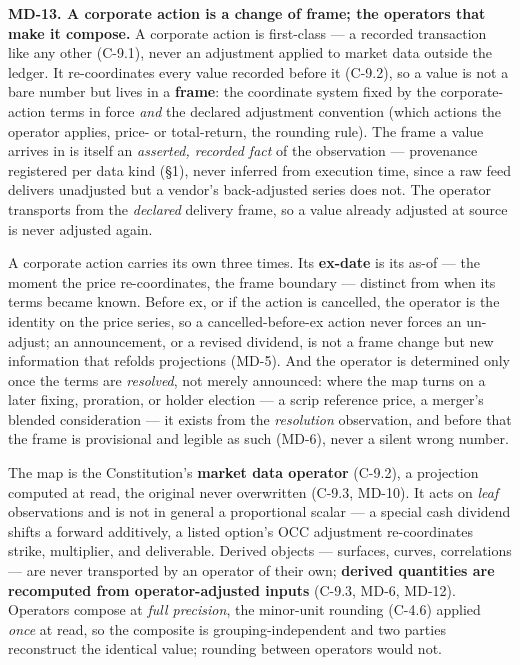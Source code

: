 \documentclass[11pt,a4paper]{article}
\newcommand{\mlabel}[1]{\leavevmode\hypertarget{md-#1}{}%
  \marginpar{\raggedright\scriptsize\ttfamily\textcolor{gray}{#1}}}
\begin{document}
\mlabel{MD-13}\textbf{MD-13. A corporate action is a change of frame; the
operators that make it compose.} A corporate action is first-class --- a
recorded transaction like any other (C-9.1), never an adjustment applied
to market data outside the ledger. It re-coordinates every value recorded
before it (C-9.2), so a value is not a bare number but lives in a
\textbf{frame}: the coordinate system fixed by the corporate-action terms
in force \emph{and} the declared adjustment convention (which actions the
operator applies, price- or total-return, the rounding rule). The frame a
value arrives in is itself an \emph{asserted, recorded
fact} of the observation --- provenance registered per data kind (\S1),
never inferred from execution time, since a raw feed delivers unadjusted
but a vendor's back-adjusted series does not. The operator transports from
the \emph{declared} delivery frame, so a value already adjusted at source
is never adjusted again.

A corporate action carries its own three times. Its \textbf{ex-date} is
its as-of --- the moment the price re-coordinates, the frame boundary ---
distinct from when its terms became known. Before ex, or if the action is
cancelled, the operator is the identity on the price series, so a
cancelled-before-ex action never forces an un-adjust; an announcement, or
a revised dividend, is not a frame change but new information that refolds
projections (MD-5). And the operator is determined only once the terms are
\emph{resolved}, not merely announced: where the map turns on a later
fixing, proration, or holder election --- a scrip reference price, a
merger's blended consideration --- it exists from the \emph{resolution}
observation, and before that the frame is provisional and legible as such
(MD-6), never a silent wrong number.

The map is the Constitution's \textbf{market data operator} (C-9.2), a
projection computed at read, the original never overwritten (C-9.3,
MD-10). It acts on \emph{leaf} observations and is not in general a
proportional scalar --- a special cash dividend shifts a forward
additively, a listed option's OCC adjustment re-coordinates strike,
multiplier, and deliverable. Derived objects --- surfaces, curves,
correlations --- are never transported by an operator of their own;
\textbf{derived quantities are recomputed from operator-adjusted inputs}
(C-9.3, MD-6, MD-12). Operators compose at \emph{full precision}, the
minor-unit rounding (C-4.6) applied \emph{once} at read, so the composite
is grouping-independent and two parties reconstruct the identical value;
rounding between operators would not.
\end{document}

